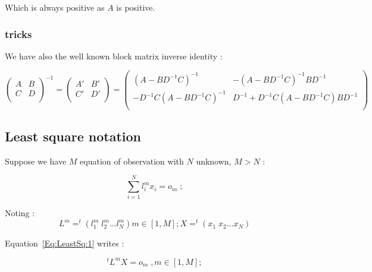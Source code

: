 Which is always positive as $A$ is positive.

\subsubsection{tricks}
We have also the well known block matrix inverse identity :

\begin{equation}
\left( \begin{array}{cc} 
              A & B \\ 
              C  & D\\ 
        \end{array} 
\right) ^{-1}
= 
\left( \begin{array}{cc} 
              A' & B' \\ 
              C'  & D'\\ 
        \end{array} 
\right) 
= 
\left( \begin{array}{cc} 
              (A-BD^{-1}C)^{-1} & -(A-BD^{-1}C)^{-1} BD^{-1} \\ 
              -D^{-1}C(A-BD^{-1}C)^{-1}  &  D^{-1}+D^{-1}C(A-BD^{-1}C) BD^{-1}\\ 
        \end{array} 
\right) 
\label{Eq:BlockInv}
\end{equation}




\subsection{Least square notation}

Suppose we have $M$ equation of observation with $N$ unknown, $M>N$ :

\begin{equation}
    \sum\limits_{i=1}^N l_i^ m x_i = o_m \; ; \label{Eq:LeastSq:1}
\end{equation}

Noting :
\begin{equation}
    L^m = ^t (l_1^m \;  l_2^m \dots l_N^m)  m \in [1,M] ;  X= ^t (x_1 \; x_2 \dots x_N) 
\end{equation}

Equation~\ref{Eq:LeastSq:1} writes :

\begin{equation}
     ^t L^m  X  = o_m \; ,  m \in [1,M] ;
\end{equation}


